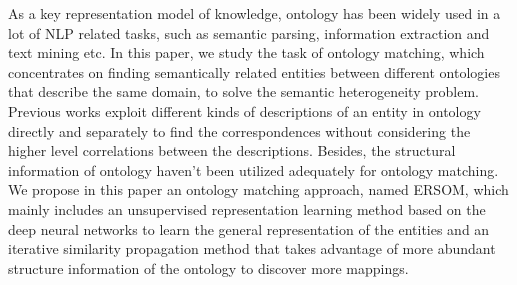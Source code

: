 As a key representation model of knowledge, ontology has been widely used in a lot of NLP related tasks, such as semantic parsing, information extraction and text mining etc. In this paper, we study the task of ontology matching, which concentrates on finding semantically related entities between different ontologies that describe the same domain, to solve the semantic heterogeneity problem. Previous works exploit different kinds of descriptions of an entity in ontology directly and separately to find the correspondences without considering the higher level correlations between the descriptions. Besides, the structural information of ontology haven't been utilized adequately for ontology matching. We propose in this paper an ontology matching approach, named ERSOM, which mainly includes an unsupervised representation learning method based on the deep neural networks to learn the general representation of the entities and an iterative similarity propagation method that takes advantage of more abundant structure information of the ontology to discover more mappings.

